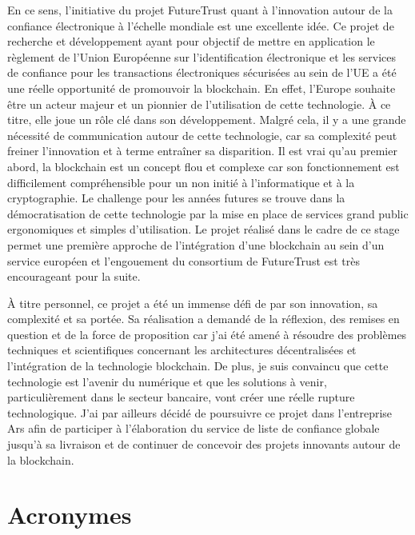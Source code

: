 \documentclass{tnreport}
\begin{document}
En ce sens, l’initiative du projet FutureTrust quant à l'innovation autour de la confiance électronique à l'échelle mondiale est une excellente idée. 
Ce projet de recherche et développement ayant pour objectif de mettre en application le règlement de l'Union Européenne sur l'identification électronique et les services de confiance pour les transactions électroniques sécurisées au sein de l'UE a été une réelle opportunité de promouvoir la blockchain.
En effet, l'Europe souhaite être un acteur majeur et un pionnier de l'utilisation de cette technologie. À ce titre, elle joue un rôle clé dans son développement.
Malgré cela, il y a une grande nécessité de communication autour de cette technologie, car sa complexité peut freiner l'innovation et à terme entraîner sa disparition.
Il est vrai qu'au premier abord, la blockchain est un concept flou et complexe car son fonctionnement est difficilement compréhensible pour un non initié à l'informatique et à la cryptographie.
Le challenge pour les années futures se trouve dans la démocratisation de cette technologie par la mise en place de services grand public ergonomiques et simples d'utilisation.
Le projet réalisé dans le cadre de ce stage permet une première approche de l'intégration d'une blockchain au sein d'un service européen et l'engouement du consortium de FutureTrust est très encourageant pour la suite.

À titre personnel, ce projet a été un immense défi de par son innovation, sa complexité et sa portée. Sa réalisation a demandé de la réflexion, des remises en question et de la force de proposition car j'ai été amené à résoudre des problèmes techniques et scientifiques concernant les architectures décentralisées et l'intégration de la technologie blockchain.
De plus, je suis convaincu que cette technologie est l’avenir du numérique et
que les solutions à venir, particulièrement dans le secteur bancaire, vont créer une réelle rupture technologique.
J’ai par ailleurs décidé de poursuivre ce projet dans l'entreprise Ar{\texteta}s afin de participer à l'élaboration du service de liste de confiance globale jusqu'à sa livraison et de continuer de concevoir des projets innovants autour de la blockchain.

\cleardoublepage
\renewcommand{\tocbibname}{Bibliographie / Webographie}


\listoffigures

\lstlistoflistings

\chapter*{Acronymes}
\end{document}
